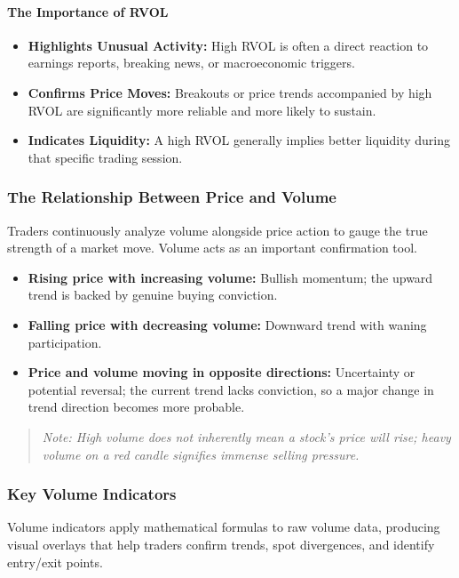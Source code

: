 \documentclass[12pt,openany]{book}
\begin{document}
\paragraph{The Importance of RVOL}
\begin{itemize}[leftmargin=*]
    \item \textbf{Highlights Unusual Activity:} High RVOL is often a direct reaction to earnings reports, breaking news, or macroeconomic triggers.
    \item \textbf{Confirms Price Moves:} Breakouts or price trends accompanied by high RVOL are significantly more reliable and more likely to sustain.
    \item \textbf{Indicates Liquidity:} A high RVOL generally implies better liquidity during that specific trading session.
\end{itemize}

\subsubsection{The Relationship Between Price and Volume}
Traders continuously analyze volume alongside price action to gauge the true strength of a market move. Volume acts as an important confirmation tool.

\begin{itemize}[leftmargin=*]
    \item \textbf{Rising price with increasing volume:} Bullish momentum; the upward trend is backed by genuine buying conviction.
    \item \textbf{Falling price with decreasing volume:} Downward trend with waning participation.
    \item \textbf{Price and volume moving in opposite directions:} Uncertainty or potential reversal; the current trend lacks conviction, so a major change in trend direction becomes more probable.
\end{itemize}

\begin{quote}
\textit{Note: High volume does not inherently mean a stock's price will rise; heavy volume on a red candle signifies immense selling pressure.}
\end{quote}

\subsubsection{Key Volume Indicators}
Volume indicators apply mathematical formulas to raw volume data, producing visual overlays that help traders confirm trends, spot divergences, and identify entry/exit points.
\end{document}

